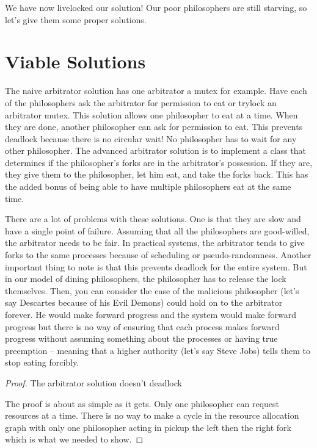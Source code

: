 We have now livelocked our solution! Our poor philosophers are still starving, so let's give them some proper solutions.

\section{Viable Solutions}

The naive arbitrator solution has one arbitrator a mutex for example.
Have each of the philosophers ask the arbitrator for permission to eat or trylock an arbitrator mutex.
This solution allows one philosopher to eat at a time.
When they are done, another philosopher can ask for permission to eat.
This prevents deadlock because there is no circular wait! No philosopher has to wait for any other philosopher.
The advanced arbitrator solution is to implement a class that determines if the philosopher's forks are in the arbitrator's possession.
If they are, they give them to the philosopher, let him eat, and take the forks back.
This has the added bonus of being able to have multiple philosophers eat at the same time.

There are a lot of problems with these solutions.
One is that they are slow and have a single point of failure.
Assuming that all the philosophers are good-willed, the arbitrator needs to be fair.
In practical systems, the arbitrator tends to give forks to the same processes because of scheduling or pseudo-randomness.
Another important thing to note is that this prevents deadlock for the entire system.
But in our model of dining philosophers, the philosopher has to release the lock themselves.
Then, you can consider the case of the malicious philosopher (let's say Descartes because of his Evil Demons) could hold on to the arbitrator forever.
He would make forward progress and the system would make forward progress but there is no way of ensuring that each process makes forward progress without assuming something about the processes or having true preemption -- meaning that a higher authority (let's say Steve Jobs) tells them to stop eating forcibly.


\begin{proof} The arbitrator solution doesn't deadlock

The proof is about as simple as it gets. Only one philosopher can request resources at a time. There is no way to make a cycle in the resource allocation graph with only one philosopher acting in pickup the left then the right fork which is what we needed to show.

\end{proof}

